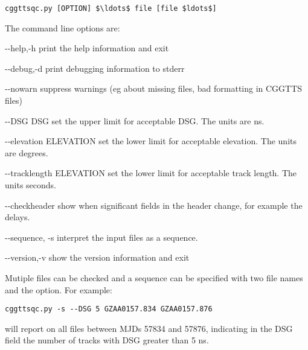 \begin{lstlisting}[mathescape=true]
cggttsqc.py [OPTION] $\ldots$ file [file $ldots$]
\end{lstlisting}
The command line options are:
\begin{description*}
	\item[-{}-help,-h]	print the help information and exit
	\item[-{}-debug,-d]	print debugging information to stderr
	\item[-{}-nowarn]   suppress warnings (eg about missing files, bad formatting in CGGTTS files)
	\item[-{}-DSG DSG]  set the upper limit for acceptable DSG. The units are ns.
	\item[-{}-elevation ELEVATION] set the lower limit for acceptable elevation. The units are degrees.
	\item[-{}-tracklength  ELEVATION] set the lower limit for acceptable track length. The units seconds.
	\item[-{}-checkheader] show when significant fields in the header change, for example the delays.
	\item[-{}-sequence, -s] interpret the input files as a sequence.
	\item[-{}-version,-v] show the version information and exit
\end{description*}
Mutiple files can be checked and a sequence can be specified with two file names and the  option.
For example:
\begin{lstlisting}
cggttsqc.py -s --DSG 5 GZAA0157.834 GZAA0157.876
\end{lstlisting}
will report on all files between MJDs 57834 and 57876, indicating in the DSG field the number of tracks with DSG greater
than 5 ns.
